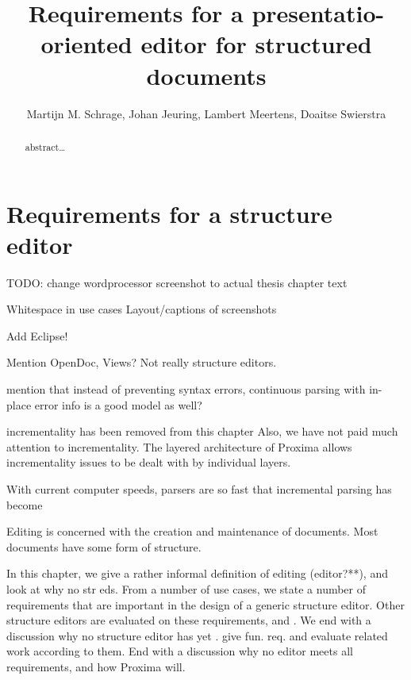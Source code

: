 \documentclass{speauth}
\begin{document}


  \title{Requirements for a presentatio-oriented editor for structured documents} 
  \author{Martijn M. Schrage, Johan Jeuring, Lambert Meertens, Doaitse Swierstra}
  \address{Institute of Information and Computing Sciences\\ Utrecht University\\
    Utrecht, The Netherlands}     
\begin{abstract} 
  abstract\dots
\end{abstract}


\section{Requirements for a structure editor} \label{chap:requirements}



\bc

TODO: change wordprocessor screenshot to actual thesis chapter text

Whitespace in use cases
Layout/captions of screenshots

Add Eclipse!





Mention OpenDoc, Views? Not really structure editors.

mention that instead of preventing syntax errors, continuous parsing with in-place error 
info is a good model as well?

incrementality  has been removed from this chapter
Also, we have not paid much attention to incrementality. The layered architecture of Proxima allows incrementality issues to be dealt with by individual layers. 

With current computer speeds, parsers are so fast that incremental parsing has become %
\ec

\bc
Editing is concerned with the creation and maintenance of documents.  
Most documents have some form of structure. 

In this chapter, we give a rather informal definition of editing (editor?**), and look at why no str eds. From a number of use cases, we state a number of requirements that are important in the design of a generic structure editor. Other structure editors are evaluated on these requirements, and . We end with a discussion why no structure editor has yet .  give fun. req. and evaluate related work according to them. End with a discussion why no editor meets all requirements, and how Proxima will.
\ec
\end{document}
